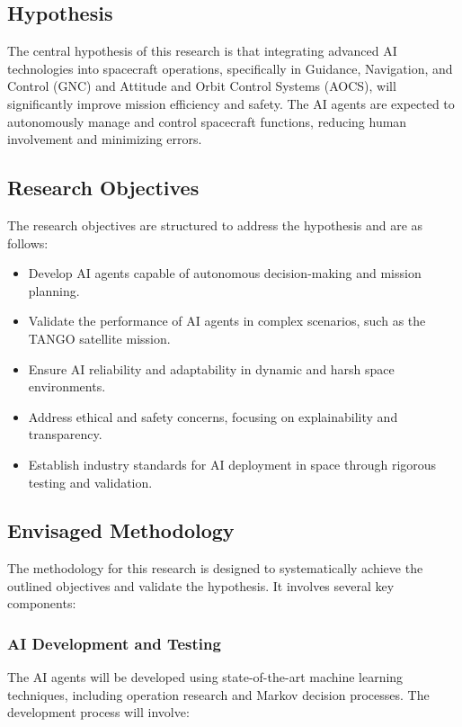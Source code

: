 \documentclass[a4paper, 11pt]{article}
\begin{document}
\subsection{Hypothesis}

The central hypothesis of this research is that integrating advanced AI technologies into spacecraft operations, specifically in Guidance, Navigation, and Control (GNC) and Attitude and Orbit Control Systems (AOCS), will significantly improve mission efficiency and safety. The AI agents are expected to autonomously manage and control spacecraft functions, reducing human involvement and minimizing errors.

\subsection{Research Objectives}

The research objectives are structured to address the hypothesis and are as follows:

\begin{itemize}
    \item Develop AI agents capable of autonomous decision-making and mission planning.
    \item Validate the performance of AI agents in complex scenarios, such as the TANGO satellite mission.
    \item Ensure AI reliability and adaptability in dynamic and harsh space environments.
    \item Address ethical and safety concerns, focusing on explainability and transparency.
    \item Establish industry standards for AI deployment in space through rigorous testing and validation.
\end{itemize}

\subsection{Envisaged Methodology}

The methodology for this research is designed to systematically achieve the outlined objectives and validate the hypothesis. It involves several key components:

\subsubsection{AI Development and Testing}

The AI agents will be developed using state-of-the-art machine learning techniques, including operation research and Markov decision processes. The development process will involve:
\end{document}
